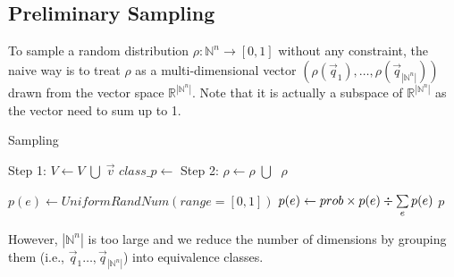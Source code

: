 \begin{appendices}
\subsection{Preliminary Sampling}
To sample a random distribution $\rho : \mathbb{N}^n\to[0,1]$ without any constraint, the naive way is to treat $\rho$ as a multi-dimensional vector $(\rho(\vec{q}_1),\ldots,\rho(\vec{q}_{|\mathbb{N}^n|}))$ drawn from the vector space $\mathbb{R}^{|\mathbb{N}^n|}$. Note that it is actually a subspace of $\mathbb{R}^{|\mathbb{N}^n|}$ as the vector need to sum up to 1.
\begin{algorithm}
\caption{Sampling}
\label{alg:sampling}
\begin{algorithmic}[1]
\label{procedure:twostepsampling}
\State Step 1:
\State $V \gets V\; \bigcup \;\vec{v}$
\EndFor
\State $class\_p \gets $
\State Step 2:
\State $\rho \gets \rho\; \bigcup \; $
\EndFor
\State \Return $\rho$
\EndProcedure

\State

\State $p(e) \gets UniformRandNum(range=[0,1])$
\EndFor
{}
\State $p(e) \gets prob\times p(e)\div\operatorname*{\sum}\limits_{e}p(e)$
\EndFor
\State \Return $p$
\EndProcedure
\end{algorithmic}
\end{algorithm}
However, $|\mathbb{N}^n|$ is too large and we reduce the number of dimensions by grouping them (i.e., $\vec{q}_1\ldots,\vec{q}_{|\mathbb{N}^n|}$) into equivalence classes.


\end{appendices}
